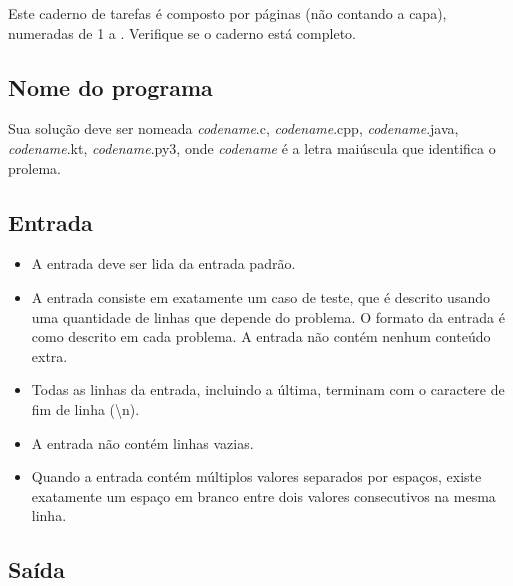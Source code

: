 

Este caderno de tarefas é composto por \pageref{lastpage} páginas (não
contando a capa), numeradas 
de 1 a \pageref{lastpage}. Verifique se o caderno está completo.

\subsection*{Nome do programa}
Sua solução deve ser nomeada \textit{codename}.c, \textit{codename}.cpp, \textit{codename}.java, \textit{codename}.kt, \textit{codename}.py3, onde \textit{codename } é a letra maiúscula que identifica o prolema.

\subsection*{Entrada}

\begin{itemize}
\item A entrada deve ser lida da entrada padrão.

\item A entrada consiste em exatamente um caso de teste, que é descrito usando uma
quantidade de linhas que depende do problema. O formato da entrada é como descrito
em cada problema. A entrada não contém nenhum conteúdo extra.

\item Todas as linhas da entrada, incluindo a última, terminam com o caractere de fim
de linha (\textbackslash n).

\item A entrada não contém linhas vazias.

\item Quando a entrada contém múltiplos valores separados por espaços, 
existe exatamente um espaço em branco entre dois valores consecutivos na mesma linha.

\end{itemize}

\subsection*{Saída}

